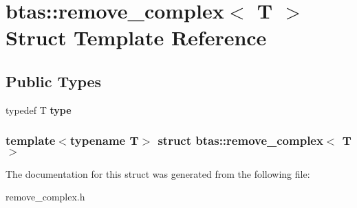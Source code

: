 \hypertarget{structbtas_1_1remove__complex}{
\section{btas::remove\_\-complex$<$ T $>$ Struct Template Reference}
\label{structbtas_1_1remove__complex}
}
\subsection*{Public Types}
\begin{DoxyCompactItemize}
\item 
\hypertarget{structbtas_1_1remove__complex_a4413152433a14c6ed7ec4a3054460095}{
typedef T {\bfseries type}}
\label{structbtas_1_1remove__complex_a4413152433a14c6ed7ec4a3054460095}

\end{DoxyCompactItemize}
\subsubsection*{template$<$typename T$>$ struct btas::remove\_\-complex$<$ T $>$}



The documentation for this struct was generated from the following file:\begin{DoxyCompactItemize}
\item 
remove\_\-complex.h\end{DoxyCompactItemize}
